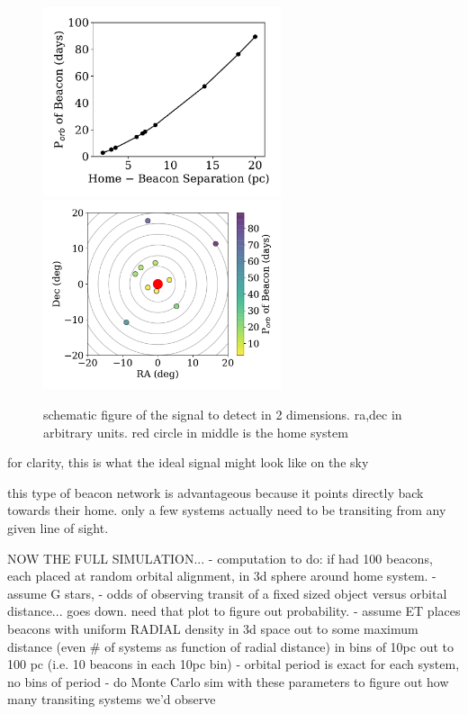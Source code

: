 \documentclass[twocolumn]{aastex62}
\begin{document}
\begin{figure}[]
\centering
\includegraphics[width=2.75in]{../figures/dist_per.pdf}
\includegraphics[width=2.75in]{../figures/sky_per.pdf}
\caption{schematic figure of the signal to detect in 2 dimensions. ra,dec in arbitrary units. red circle in middle is the home system}
\label{fig:2d}
\end{figure}


for clarity, this is what the ideal signal might look like on the sky



this type of beacon network is advantageous because it points directly back towards their home. only a few systems actually need to be transiting from any given line of sight.

NOW THE FULL SIMULATION...
- computation to do: if had 100 beacons, each placed at random orbital alignment, in 3d sphere around home system.
- assume G stars, 
- odds of observing transit of a fixed sized object versus orbital distance... goes down. need that plot to figure out probability. 
- assume ET places beacons with uniform RADIAL density in 3d space out to some maximum distance (even \# of systems as function of radial distance) in bins of 10pc out to 100 pc (i.e. 10 beacons in each 10pc bin)
- orbital period is exact for each system, no bins of period
- do Monte Carlo sim with these parameters to figure out how many transiting systems we'd observe 
\end{document}
